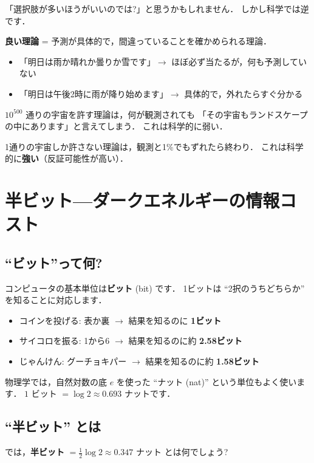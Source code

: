 \documentclass[11pt,a4paper]{article}
\begin{document}
「選択肢が多いほうがいいのでは?」と思うかもしれません．
しかし科学では逆です．

\textbf{良い理論} = 予測が具体的で，間違っていることを確かめられる理論．

\begin{itemize}
\item 「明日は雨か晴れか曇りか雪です」$\to$ ほぼ必ず当たるが，何も予測していない
\item 「明日は午後2時に雨が降り始めます」$\to$ 具体的で，外れたらすぐ分かる
\end{itemize}

$10^{500}$ 通りの宇宙を許す理論は，何が観測されても
「その宇宙もランドスケープの中にあります」と言えてしまう．
これは科学的に弱い．

1通りの宇宙しか許さない理論は，観測と1\%でもずれたら終わり．
これは科学的に\textbf{強い}（反証可能性が高い）．

\section{半ビット---ダークエネルギーの情報コスト}

\subsection{``ビット''って何?}

コンピュータの基本単位は\textbf{ビット} (bit) です．
1ビットは ``2択のうちどちらか'' を知ることに対応します．

\begin{itemize}
\item コインを投げる: 表か裏 $\to$ 結果を知るのに \textbf{1ビット}
\item サイコロを振る: 1から6 $\to$ 結果を知るのに約 \textbf{2.58ビット}
\item じゃんけん: グーチョキパー $\to$ 結果を知るのに約 \textbf{1.58ビット}
\end{itemize}

物理学では，自然対数の底 $e$ を使った ``ナット (nat)'' という単位もよく使います．
$1$ ビット $= \log 2 \approx 0.693$ ナットです．

\subsection{``半ビット'' とは}

では，\textbf{半ビット} $= \frac{1}{2}\log 2 \approx 0.347$ ナット
とは何でしょう?
\end{document}
